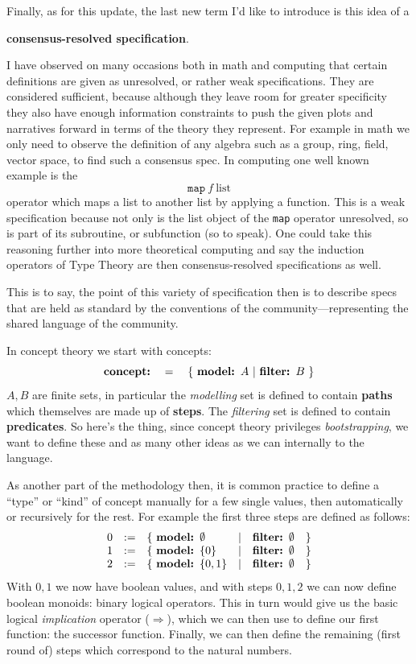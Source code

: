 \documentclass[twoside]{article}
\newcommand{\strong}[1]{{\bfseries #1}}
\newcommand{\bfmbox}[1]{\mbox{\bfseries #1}}
\begin{document}
Finally, as for this update, the last new term I'd like to introduce is this idea of a
\begin{center}
\strong{consensus-resolved specification}.
\end{center}
I have observed on many occasions both in math and computing that certain definitions are given as unresolved, or rather
weak specifications. They are considered sufficient, because although they leave room for greater specificity they also
have enough information constraints to push the given plots and narratives forward in terms of the theory they represent.
For example in math we only need to observe the definition of any algebra such as a group, ring, field, vector space,
to find such a consensus spec. In computing one well known example is the
$$ \texttt{map}\ f\ \mbox{list} $$
operator which maps a list to another list by applying a function. This is a weak specification because not only is the
list object of the \texttt{map} operator unresolved, so is part of its subroutine, or subfunction (so to speak). One could
take this reasoning further into more theoretical computing and say the induction operators of Type Theory are then
consensus-resolved specifications as well.

This is to say, the point of this variety of specification then is to describe specs that are held as standard
by the conventions of the community---representing the shared language of the community.

\newpage

In concept theory we start with concepts:
$$ \bfmbox{concept:} \quad = \quad \{\ \bfmbox{model: } A\ |\ \bfmbox{filter: } B\ \} $$
$ A, B $ are finite sets, in particular the \emph{modelling} set is defined to contain {\bfseries paths} which
themselves are made up of {\bfseries steps}. The \emph{filtering} set is defined to contain {\bfseries predicates}.
So here's the thing, since concept theory privileges \emph{bootstrapping}, we want to define these and as many
other ideas as we can internally to the language.

As another part of the methodology then, it is common practice to define a ``type'' or ``kind'' of concept manually
for a few single values, then automatically or recursively for the rest. For example the first three steps
are defined as follows:
$$ \begin{array}{lcllll}
0 & := & \{\ \bfmbox{model: } \emptyset & | & \bfmbox{filter: } \emptyset & \}	\\
1 & := & \{\ \bfmbox{model: } \{0\} & | & \bfmbox{filter: } \emptyset & \}	\\
2 & := & \{\ \bfmbox{model: } \{0,1\} & | & \bfmbox{filter: } \emptyset & \}	\\
\end{array} $$
With $ 0,1 $ we now have boolean values, and with steps $ 0,1,2 $ we can now define boolean monoids: binary logical
operators. This in turn would give us the basic logical \emph{implication} operator ($ \Rightarrow $), which we can
then use to define our first function: the successor function. Finally, we can then define the remaining (first round
of) steps which correspond to the natural numbers.
\end{document}
